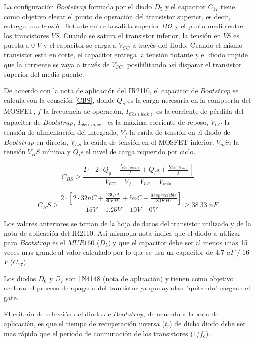 \documentclass[11pt, a4paper]{article}
\begin{document}
La configuración $Bootstrap$ formada por el diodo $D_5$ y el capacitor $C_{17}$ tiene como objetivo elevar el punto de operación del transistor superior, es decir, entrega una tensión flotante entre la salida superior $HO$ y el punto medio entre los transistores $VS$. Cuando se satura el transistor inferior, la tensión en $VS$ es puesta a $0$ $V$ y el capacitor se carga a $V_{CC}$ a través del diodo. Cuando el mismo transistor está en corte, el capacitor entrega la tensión flotante y el diodo impide que la corriente se vaya a través de $V_{CC}$, posibilitando así disparar el transistor superior del medio puente.

De acuerdo con la nota de aplicación del IR2110, el capacitor de $Bootstrap$ se calcula con la ecuación \ref{CBS}, donde $Q_g$ es la carga necesaria en la compuerta del MOSFET, $f$ la frecuencia de operación, $I_{Cbs(leak)}$  es la corriente de pérdida del capacitor de $Bootstrap$, $I_{qbs(max)}$ es la máxima corriente de reposo, $V_{CC}$ la tensión de alimentación del integrado, $V_f$ la caída de tensión en el diodo de $Bootstrap$ en directa, $V_{LS}$ la caída de tensión en el MOSFET inferior, $V_min$ la tensión $V_BS$ mínima y $Q_ls$ el nivel de carga requerido por ciclo.

\begin{equation}
C_{BS} \geq \frac{ 2 \cdot [2\cdot Q_g + \frac{I_{qbs(max)}}{f} + Q_ls + \frac{I_{Cbs(leak)}}{f}]}{V_{CC} - V_f - V_{LS} - V_{min}}
\label{CBS} 
\end{equation}

\[ C_BS \geq \frac{ 2 \cdot [2\cdot 32nC + \frac{230 \mu A}{80 KHz} + 5 nC + \frac{despreciable}{80 KHz}]}{15 V - 1.25 V - 10 V - 0 V} \geq 38.33 \; nF \]

Los valores anteriores se toman de la hoja de datos del transistor utilizado y de la nota de aplicación del IR2110. Así mismo,la nota indica que el diodo a utilizar para $Bootstrap$ es el $MUR160$ ($D_5$) y que el capacitor debe ser al menos unas 15 veces mas grande al valor calculado por lo que se usa un capacitor de $4.7$ $\mu F\; /\; 16$ $V$ ($C_{17}$).

Los diodos $D_6$ y $D_7$ son 1N4148 (nota de aplicación) y tienen como objetivo acelerar el proceso de apagado del transistor ya que ayudan "quitando" cargas del gate.

El criterio de selección del diodo de $Bootstrap$, de acuerdo a la nota de aplicación, es que el tiempo de recuperación inversa ($t_r$) de dicho diodo debe ser mas rápido que el período de conmutación de los transistores ($1/f_c$).
\end{document}
